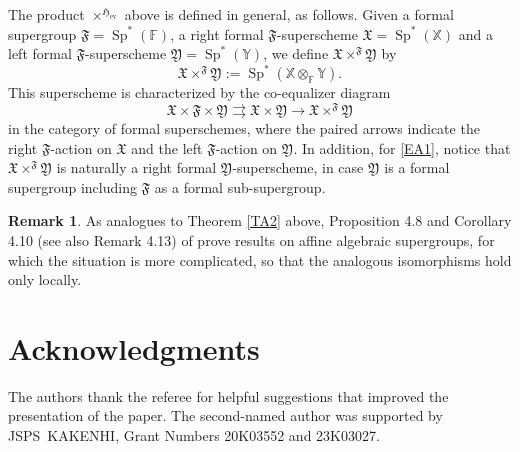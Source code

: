 \documentclass[11pt, a4paper]{amsart}
\theoremstyle{definition}
\newtheorem{rem}[theorem]{Remark}
\numberwithin{equation}{section}
\begin{document}
The product $\times^{\mathfrak{H}_{\operatorname{ev}}}$ above is defined in general, as follows. 
Given a formal supergroup 
$\mathfrak{F}= \operatorname{Sp}^*(\mathbb{F})$, a right formal $\mathfrak{F}$-superscheme 
$\mathfrak{X}= \operatorname{Sp}^*(\mathbb{X})$ and a left formal $\mathfrak{F}$-superscheme 
$\mathfrak{Y}= \operatorname{Sp}^*(\mathbb{Y})$, we define $\mathfrak{X}\times^{\mathfrak{F}}\mathfrak{Y}$ by
\[
\mathfrak{X}\times^{\mathfrak{F}}\mathfrak{Y}:=\operatorname{Sp}^*(\mathbb{X}\otimes_{\mathbb{F}}\mathbb{Y}).
\] 
This superscheme is characterized by the co-equalizer diagram 
\[
\mathfrak{X}\times {\mathfrak{F}}\times \mathfrak{Y} \rightrightarrows \mathfrak{X}\times \mathfrak{Y}\to
\mathfrak{X}\times^{\mathfrak{F}}\mathfrak{Y}
\]
in the category of formal superschemes, where the paired arrows indicate the right $\mathfrak{F}$-action on 
$\mathfrak{X}$ and the left $\mathfrak{F}$-action on $\mathfrak{Y}$. 
In addition, for \eqref{EA1}, notice that 
$\mathfrak{X}\times^{\mathfrak{F}}\mathfrak{Y}$ is naturally a right
formal $\mathfrak{Y}$-superscheme,
in case $\mathfrak{Y}$ is a formal supergroup including $\mathfrak{F}$
as a formal sub-supergroup.

\begin{rem}
As analogues to Theorem \ref{TA2} above, 
Proposition 4.8 and Corollary 4.10 (see also Remark 4.13) of \cite{MT} prove results on affine algebraic supergroups, for which the situation is more complicated, so that the analogous isomorphisms hold only locally.
\end{rem}

\section*{Acknowledgments}
The authors thank the referee for helpful suggestions that improved the presentation of the paper.
The second-named author was supported by JSPS~KAKENHI, Grant Numbers 20K03552 and 23K03027.
\end{document}
